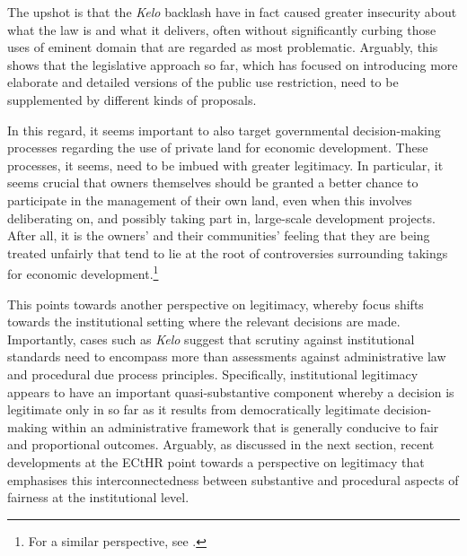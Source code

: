 The upshot is that the {\it Kelo} backlash have in fact caused greater insecurity about what the law is and what it delivers, often without significantly curbing those uses of eminent domain that are regarded as most problematic. Arguably, this shows that the legislative approach so far, which has focused on introducing more elaborate and detailed versions of the public use restriction, need to be supplemented by different kinds of proposals. 

In this regard, it seems important to also target governmental decision-making processes regarding the use of private land for economic development. These processes, it seems, need to be imbued with greater legitimacy. In particular, it seems crucial that owners themselves should be granted a better chance to participate in the management of their own land, even when this involves deliberating on, and possibly taking part in, large-scale development projects. After all, it is the owners' and their communities' feeling that they are being treated unfairly that tend to lie at the root of controversies surrounding takings for economic development.\footnote{For a similar perspective, see \cite{underkuffler06}.}

This points towards another perspective on legitimacy, whereby focus shifts towards the institutional setting where the relevant decisions are made. Importantly, cases such as {\it Kelo} suggest that scrutiny against institutional standards need to encompass more than assessments against administrative law and procedural due process principles. Specifically, institutional legitimacy appears to have an important quasi-substantive component whereby a decision is legitimate only in so far as it results from democratically legitimate decision-making within an administrative framework that is generally conducive to fair and proportional outcomes. Arguably, as discussed in the next section, recent developments at the ECtHR point towards a perspective on legitimacy that emphasises this interconnectedness between substantive and procedural aspects of fairness at the institutional level.

